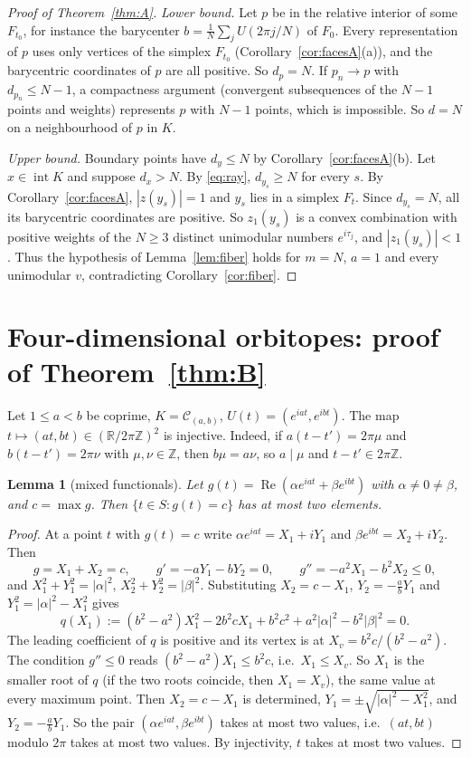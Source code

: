 \documentclass[11pt]{amsart}
\newtheorem{lemma}[theorem]{Lemma}
\theoremstyle{remark}
\newcommand{\R}{\mathbb{R}}
\newcommand{\Z}{\mathbb{Z}}
\newcommand{\re}{\operatorname{Re}}
\newcommand{\inter}{\operatorname{int}}
\begin{document}
\begin{proof}[Proof of Theorem~\ref{thm:A}]
\emph{Lower bound.} Let $p$ be in the relative interior of some $F_{t_0}$, for instance the barycenter $b=\frac1N\sum_jU(2\pi j/N)$ of $F_0$. Every representation of $p$
uses only vertices of the simplex $F_{t_0}$ (Corollary~\ref{cor:facesA}(a)), and the barycentric coordinates of $p$ are all positive. So $d_p=N$. If $p_n\to p$ with
$d_{p_n}\le N-1$, a compactness argument (convergent subsequences of the $N-1$ points and weights) represents $p$ with $N-1$ points, which is impossible.
So $d=N$ on a neighbourhood of $p$ in $K$.

\emph{Upper bound.} Boundary points have $d_y\le N$ by Corollary~\ref{cor:facesA}(b). Let $x\in\inter K$ and suppose $d_x>N$. By \eqref{eq:ray},
$d_{y_s}\ge N$ for every $s$. By Corollary~\ref{cor:facesA}, $|z(y_s)|=1$ and $y_s$ lies in a simplex $F_{t}$. Since $d_{y_s}=N$, all its barycentric
coordinates are positive. So $z_1(y_s)$ is a convex combination with positive weights of the $N\ge3$ distinct unimodular numbers $e^{i\tau_j}$, and $|z_1(y_s)|<1$.
Thus the hypothesis of Lemma~\ref{lem:fiber} holds for $m=N$, $a=1$ and every unimodular $v$, contradicting Corollary~\ref{cor:fiber}.
\end{proof}

\section{Four-dimensional orbitopes: proof of Theorem~\ref{thm:B}}

Let $1\le a<b$ be coprime, $K=\mathcal C_{(a,b)}$, $U(t)=(e^{iat},e^{ibt})$. The map $t\mapsto(at,bt)\in(\R/2\pi\Z)^2$ is injective. Indeed, if
$a(t-t')=2\pi\mu$ and $b(t-t')=2\pi\nu$ with $\mu,\nu\in\Z$, then $b\mu=a\nu$, so $a\mid\mu$ and $t-t'\in2\pi\Z$.

\begin{lemma}[mixed functionals]\label{lem:mixed}
Let $g(t)=\re(\alpha e^{iat}+\beta e^{ibt})$ with $\alpha\ne0\ne\beta$, and $c=\max g$. Then $\{t\in S: g(t)=c\}$ has at most two elements.
\end{lemma}
\begin{proof}
At a point $t$ with $g(t)=c$ write $\alpha e^{iat}=X_1+iY_1$ and $\beta e^{ibt}=X_2+iY_2$. Then
\[
g=X_1+X_2=c,\qquad g'=-aY_1-bY_2=0,\qquad g''=-a^2X_1-b^2X_2\le0,
\]
and $X_1^2+Y_1^2=|\alpha|^2$, $X_2^2+Y_2^2=|\beta|^2$. Substituting $X_2=c-X_1$, $Y_2=-\frac abY_1$ and $Y_1^2=|\alpha|^2-X_1^2$ gives
\[
q(X_1):=(b^2-a^2)X_1^2-2b^2cX_1+b^2c^2+a^2|\alpha|^2-b^2|\beta|^2=0 .
\]
The leading coefficient of $q$ is positive and its vertex is at $X_v=b^2c/(b^2-a^2)$. The condition $g''\le0$ reads $(b^2-a^2)X_1\le b^2c$, i.e.\ $X_1\le X_v$.
So $X_1$ is the smaller root of $q$ (if the two roots coincide, then $X_1=X_v$), the same value at every maximum point. Then $X_2=c-X_1$ is determined, $Y_1=\pm\sqrt{|\alpha|^2-X_1^2}$, and $Y_2=-\frac abY_1$.
So the pair $(\alpha e^{iat},\beta e^{ibt})$ takes at most two values, i.e.\ $(at,bt)$ modulo $2\pi$ takes at most two values. By injectivity, $t$ takes at most two values.
\end{proof}
\end{document}
